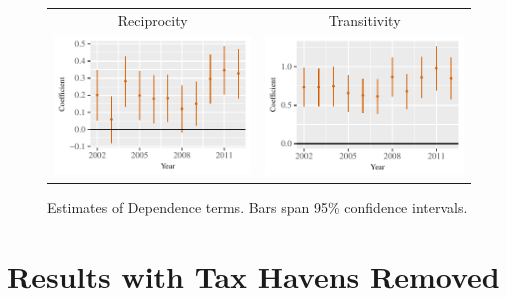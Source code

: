 \documentclass[reqno,onecolumn,letterpaper,12pt]{article}
\begin{document}
{\begin{figure}[!h]
\centering
\begin{tabular}{c@{\hskip 0cm}c}
Reciprocity & Transitivity \\
\includegraphics[height=.2\textheight, clip=true, trim=0cm 0cm 0cm .2cm]{draft_figures/rl_amelia_q25/Mutuality.pdf}    &
\includegraphics[height=.2\textheight, clip=true, trim=0cm 0cm 0cm .2cm]{draft_figures/rl_amelia_q25/Transitivity.pdf}
\end{tabular}
\caption{\label{fig:q25_amelia_netterms} Estimates of Dependence terms. Bars span 95\% confidence intervals. }
\end{figure}


\section{Results with Tax Havens Removed}\label{taxresults}

}
\end{document}
